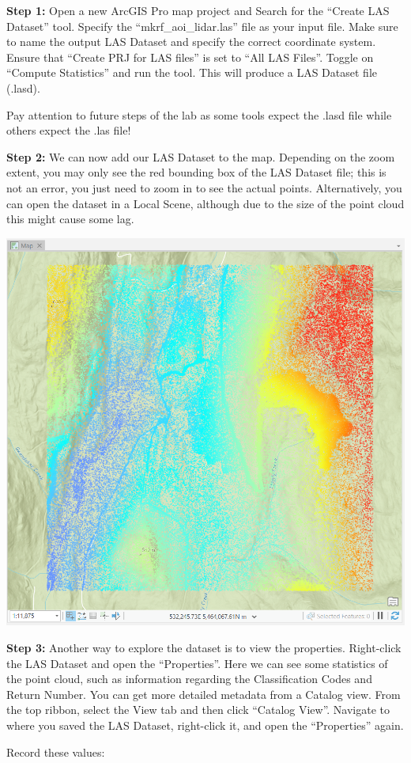 \documentclass[
]{book}
\begin{document}
\textbf{Step 1:} Open a new ArcGIS Pro map project and Search for the ``Create LAS Dataset'' tool. Specify the ``mkrf\_aoi\_lidar.las'' file as your input file. Make sure to name the output LAS Dataset and specify the correct coordinate system. Ensure that ``Create PRJ for LAS files'' is set to ``All LAS Files''. Toggle on ``Compute Statistics'' and run the tool. This will produce a LAS Dataset file (.lasd).

Pay attention to future steps of the lab as some tools expect the .lasd file while others expect the .las file!

\textbf{Step 2:} We can now add our LAS Dataset to the map. Depending on the zoom extent, you may only see the red bounding box of the LAS Dataset file; this is not an error, you just need to zoom in to see the actual points. Alternatively, you can open the dataset in a Local Scene, although due to the size of the point cloud this might cause some lag.

\includegraphics[width=0.75\linewidth]{images/01-arcgis-lasd}

\textbf{Step 3:} Another way to explore the dataset is to view the properties. Right-click the LAS Dataset and open the ``Properties''. Here we can see some statistics of the point cloud, such as information regarding the Classification Codes and Return Number. You can get more detailed metadata from a Catalog view. From the top ribbon, select the View tab and then click ``Catalog View''. Navigate to where you saved the LAS Dataset, right-click it, and open the ``Properties'' again.

Record these values:
\end{document}
